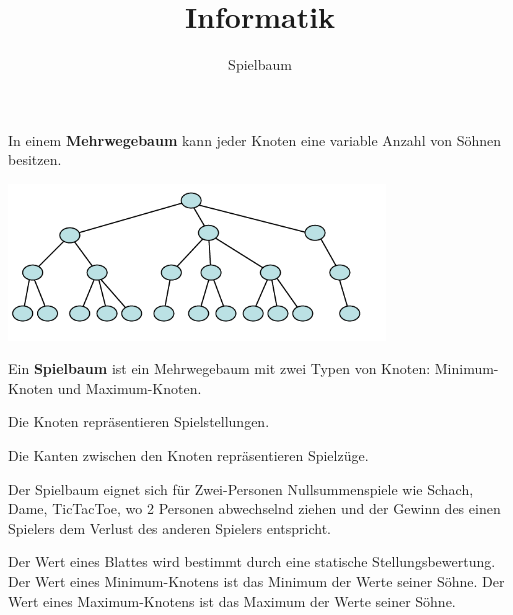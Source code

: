 \usepackage[ngerman]{babel}
\usepackage[utf8]{inputenc}
\usepackage{amsmath}
\usepackage{amssymb}
\usepackage{listings} 
\usepackage{stmaryrd}
\lstset{language=Python, tabsize=4, showstringspaces=false,basicstyle=\footnotesize,mathescape=true}
\usepackage{mathtools}
\usepackage{ulem}
\usepackage{tikz}

\parskip 10pt




\title{Informatik}   
\author{Spielbaum} 
\date{}
\frame{\titlepage} 
\small
\begin{frame}[fragile]

In einem \textbf{Mehrwegebaum} kann jeder Knoten eine variable Anzahl von Söhnen besitzen. 


\includegraphics[width=10cm]{bild1a.png} 

\end{frame}


\begin{frame}[fragile]
Ein \textbf{Spielbaum} ist ein Mehrwegebaum mit zwei Typen von Knoten: Minimum-Knoten und
Maximum-Knoten.  \pause

Die Knoten repräsentieren Spielstellungen.  \pause

Die Kanten zwischen den Knoten repräsentieren Spielzüge. \pause

Der Spielbaum eignet sich für Zwei-Personen Nullsummenspiele wie Schach, Dame, TicTacToe, wo 2 Personen
 abwechselnd ziehen und der Gewinn des einen Spielers dem Verlust des anderen Spielers entspricht. \pause
 
Der Wert eines Blattes wird bestimmt durch eine statische Stellungsbewertung. \pause
Der Wert eines Minimum-Knotens ist das Minimum der Werte seiner Söhne. 
Der Wert eines Maximum-Knotens ist das Maximum der Werte seiner Söhne. 
\end{frame}

